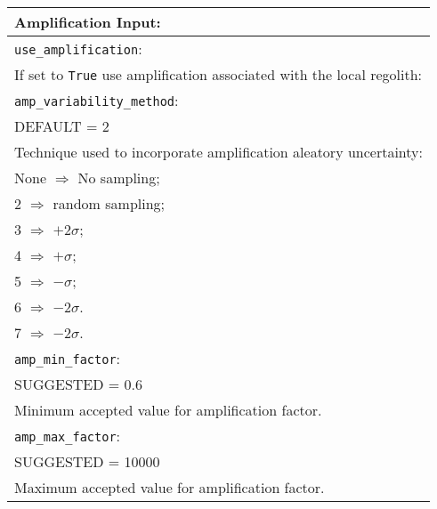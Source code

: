 \vspace{2em}
\begin{tabular}{|p{\textwidth}|}
\hline
\vspace{0.3em} \noindent \Large \textbf{Amplification Input:} \normalsize \\
\hline \vspace{0.1em} \texttt{use\_amplification}: \\
If set to \texttt{True} use amplification associated with the local regolith: \\
\hline \vspace{0.1em} \texttt{amp\_variability\_method}: \\
DEFAULT = 2 \\
Technique used to incorporate amplification aleatory uncertainty: \\
 \hspace{0.5em} None $\Rightarrow$ No sampling; \\
 \hspace{0.5em} 2 $\Rightarrow$ random sampling; \\
 \hspace{0.5em} 3 $\Rightarrow$ $+2\sigma$; \\
 \hspace{0.5em} 4 $\Rightarrow$ $+\sigma$; \\
 \hspace{0.5em} 5 $\Rightarrow$ $-\sigma$; \\
 \hspace{0.5em} 6 $\Rightarrow$ $-2\sigma$.\\
 \hspace{0.5em} 7 $\Rightarrow$ $-2\sigma$.\\
\hline \vspace{0.1em} \texttt{amp\_min\_factor}: \\
SUGGESTED = 0.6 \\
Minimum accepted value for amplification factor.    \\
\hline \vspace{0.1em} \texttt{amp\_max\_factor}: \\
SUGGESTED = 10000 \\
Maximum accepted value for amplification factor.   \\
\hline
\end{tabular}

